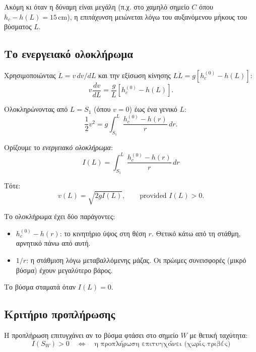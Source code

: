 \documentclass[11pt]{article}
\begin{document}
Ακόμη κι όταν η δύναμη είναι μεγάλη (π.χ. στο χαμηλό σημείο $C$ όπου $h_c - h(L) = 15$\,cm), η επιτάχυνση μειώνεται λόγω του αυξανόμενου μήκους του βύσματος $L$.

\subsection{Το ενεργειακό ολοκλήρωμα}

Χρησιμοποιώντας $\ddot{L} = v \, dv/dL$ και την εξίσωση κίνησης $L \ddot{L} = g[h_c^{(0)} - h(L)]$:
\begin{equation}
  v \frac{dv}{dL} = \frac{g}{L}[h_c^{(0)} - h(L)].
  \label{eq:v-dv-dL}
\end{equation}

Ολοκληρώνοντας από $L = S_1$ (όπου $v = 0$) έως ένα γενικό $L$:
\[
  \frac{1}{2}v^2 = g \int_{S_1}^{L} \frac{h_c^{(0)} - h(r)}{r} \, dr.
\]

Ορίζουμε το \emph{ενεργειακό ολοκλήρωμα}:
\begin{equation}
  \boxed{I(L) = \int_{S_1}^{L} \frac{h_c^{(0)} - h(r)}{r} \, dr}
  \label{eq:energy-integral}
\end{equation}

Τότε:
\begin{equation}
  v(L) = \sqrt{2 g I(L)}, \qquad \text{provided } I(L) > 0.
  \label{eq:v-from-I}
\end{equation}

Το ολοκλήρωμα έχει δύο παράγοντες:
\begin{itemize}[nosep,leftmargin=2em]
  \item $h_c^{(0)} - h(r)$: το κινητήριο ύψος στη θέση $r$. Θετικό κάτω από τη στάθμη, αρνητικό πάνω από αυτή.
  \item $1/r$: η στάθμιση λόγω μεταβαλλόμενης μάζας. Οι πρώιμες συνεισφορές (μικρό βύσμα) έχουν μεγαλύτερο βάρος.
\end{itemize}

Το βύσμα σταματά όταν $I(L) = 0$.

\subsection{Κριτήριο προπλήρωσης}

Η προπλήρωση επιτυγχάνει αν το βύσμα φτάσει στο σημείο $W$ με θετική ταχύτητα:
\begin{equation}
  \boxed{I(S_W) > 0 \quad \Longleftrightarrow \quad \text{η προπλήρωση επιτυγχάνει (χωρίς τριβές)}}
  \label{eq:priming-criterion}
\end{equation}
\end{document}
